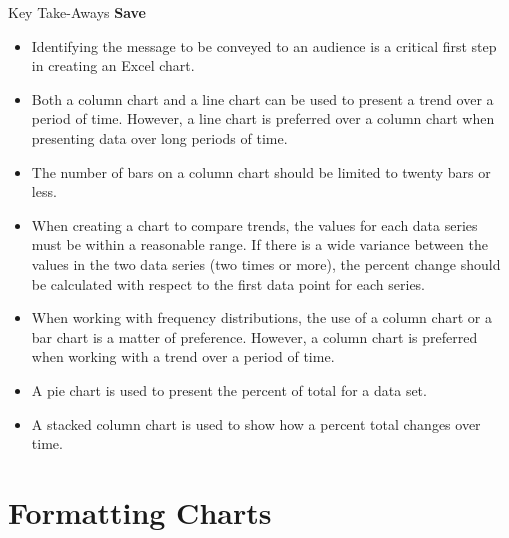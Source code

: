 \begin{center}
	\begin{tkwbox}{Key Take-Aways}
		\textbf{Save}
		\\
		\begin{itemize}
			\setlength{\itemsep}{0pt}
			\setlength{\parskip}{0pt}
			\setlength{\parsep}{0pt}
			
			\item Identifying the message to be conveyed to an audience is a critical first step in creating an Excel chart.
			\item Both a column chart and a line chart can be used to present a trend over a period of time. However, a line chart is preferred over a column chart when presenting data over long periods of time.
			\item The number of bars on a column chart should be limited to twenty bars or less.
			\item When creating a chart to compare trends, the values for each data series must be within a reasonable range. If there is a wide variance between the values in the two data series (two times or more), the percent change should be calculated with respect to the first data point for each series.
			\item When working with frequency distributions, the use of a column chart or a bar chart is a matter of preference. However, a column chart is preferred when working with a trend over a period of time.
			\item A pie chart is used to present the percent of total for a data set.
			\item A stacked column chart is used to show how a percent total changes over time.

		\end{itemize}
	\end{tkwbox}
\end{center}
\section{Formatting Charts}

